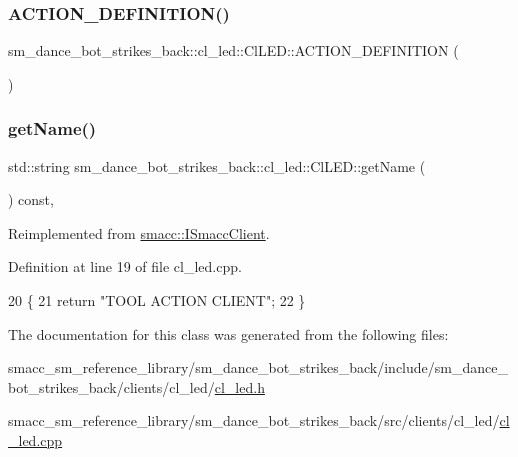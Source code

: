 \subsubsection{\texorpdfstring{A\+C\+T\+I\+O\+N\+\_\+\+D\+E\+F\+I\+N\+I\+T\+I\+O\+N()}{ACTION\_DEFINITION()}}
{\footnotesize\ttfamily sm\+\_\+dance\+\_\+bot\+\_\+strikes\+\_\+back\+::cl\+\_\+led\+::\+Cl\+L\+E\+D\+::\+A\+C\+T\+I\+O\+N\+\_\+\+D\+E\+F\+I\+N\+I\+T\+I\+ON (\begin{DoxyParamCaption}\item[{sm\+\_\+dance\+\_\+bot\+\_\+strikes\+\_\+back\+::\+L\+E\+D\+Control\+Action}]{ }\end{DoxyParamCaption})}

\mbox{\label{classsm__dance__bot__strikes__back_1_1cl__led_1_1ClLED_aa774d43fe5a936b4bf292cb5447becd9}} 
\subsubsection{\texorpdfstring{get\+Name()}{getName()}}
{\footnotesize\ttfamily std\+::string sm\+\_\+dance\+\_\+bot\+\_\+strikes\+\_\+back\+::cl\+\_\+led\+::\+Cl\+L\+E\+D\+::get\+Name (\begin{DoxyParamCaption}{ }\end{DoxyParamCaption}) const\hspace{0.3cm}{\ttfamily [override]}, {\ttfamily [virtual]}}



Reimplemented from \hyperlink{classsmacc_1_1ISmaccClient_a8c3ce19f182e71909c5dc6263d25be69}{smacc\+::\+I\+Smacc\+Client}.



Definition at line 19 of file cl\+\_\+led.\+cpp.


\begin{DoxyCode}
20 \{
21     \textcolor{keywordflow}{return} \textcolor{stringliteral}{"TOOL ACTION CLIENT"};
22 \}
\end{DoxyCode}


The documentation for this class was generated from the following files\+:\begin{DoxyCompactItemize}
\item 
smacc\+\_\+sm\+\_\+reference\+\_\+library/sm\+\_\+dance\+\_\+bot\+\_\+strikes\+\_\+back/include/sm\+\_\+dance\+\_\+bot\+\_\+strikes\+\_\+back/clients/cl\+\_\+led/\hyperlink{strikes__back_2include_2sm__dance__bot__strikes__back_2clients_2cl__led_2cl__led_8h}{cl\+\_\+led.\+h}\item 
smacc\+\_\+sm\+\_\+reference\+\_\+library/sm\+\_\+dance\+\_\+bot\+\_\+strikes\+\_\+back/src/clients/cl\+\_\+led/\hyperlink{strikes__back_2src_2clients_2cl__led_2cl__led_8cpp}{cl\+\_\+led.\+cpp}\end{DoxyCompactItemize}
